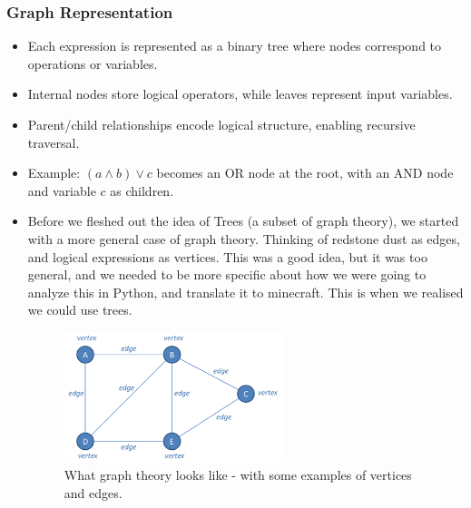\documentclass[11pt]{diazessay} %
\begin{document}
\subsubsection*{Graph Representation}
\begin{itemize}
    \item Each expression is represented as a binary tree where nodes correspond 
    to operations or variables.
    \item Internal nodes store logical operators, while leaves represent input variables.
    \item Parent/child relationships encode logical structure, enabling recursive traversal.
    \item Example: $(a \wedge b) \vee c$ becomes an OR node at the root, with an 
    AND node and variable $c$ as children.
    \item Before we fleshed out the idea of Trees (a subset of graph theory), we started with a more general case of graph theory. Thinking of redstone dust as edges, and logical expressions as vertices. This was a good idea, but it was too general, and we needed to be more specific about how we were going to analyze this in Python, and translate it to minecraft. This is when we realised we could use trees.
    \begin{figure}[h]
        \centering
        \includegraphics[width=0.6\textwidth]{gt.png}
        \caption{What graph theory looks like - with some examples of vertices and edges.}
        \label{fig:graph_theory_example}
    \end{figure}
\begin{center} %

\end{center}
\end{itemize}
\end{document}

